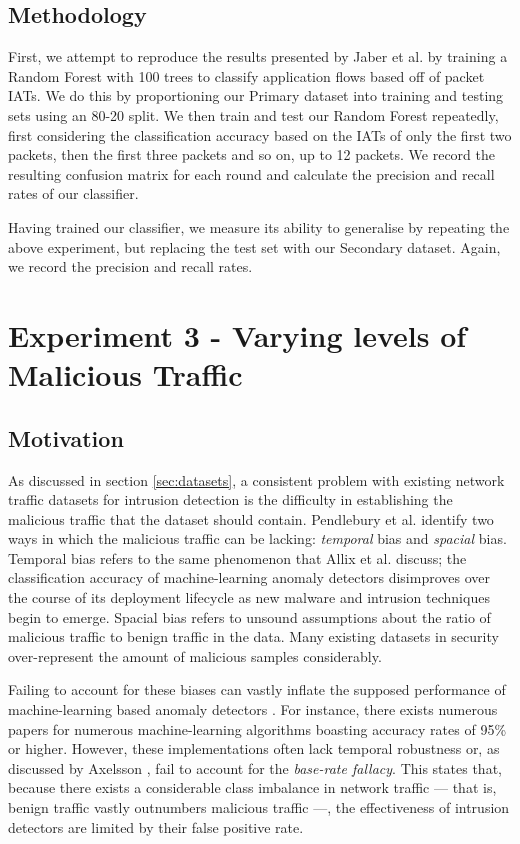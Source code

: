 \documentclass[msc,deptreport, cs]{infthesis} %
\begin{document}
\subsection{Methodology}
\label{sec:exp2_method}
First, we attempt to reproduce the results presented by Jaber et al. by training a Random Forest with 100 trees to classify application flows based off of packet IATs. We do this by proportioning our Primary dataset into training and testing sets using an 80-20 split. We then train and test our Random Forest repeatedly, first considering the classification accuracy based on the IATs of only the first two packets, then the first three packets and so on, up to 12 packets. We record the resulting confusion matrix for each round and calculate the precision and recall rates of our classifier.

Having trained our classifier, we measure its ability to generalise by repeating the above experiment, but replacing the test set with our Secondary dataset. Again, we record the precision and recall rates.

\section{Experiment 3 - Varying levels of Malicious Traffic}

\subsection{Motivation}

As discussed in section \ref{sec:datasets}, a consistent problem with existing network traffic datasets for intrusion detection is the difficulty in establishing the malicious traffic that the dataset should contain. Pendlebury et al. \cite{Pendlebury:2018:EFM:3243734.3278505} identify two ways in which the malicious traffic can be lacking: \textit{temporal} bias and \textit{spacial} bias. Temporal bias refers to the same phenomenon that Allix et al. \cite{allix2014machine} discuss; the classification accuracy of machine-learning anomaly detectors disimproves over the course of its deployment lifecycle as new malware and intrusion techniques begin to emerge. Spacial bias refers to unsound assumptions about the ratio of malicious traffic to benign traffic in the data. Many existing datasets in security over-represent the amount of malicious samples considerably.

Failing to account for these biases can vastly inflate the supposed performance of machine-learning based anomaly detectors \cite{pendlebury2019tesseract}. For instance, there exists numerous papers for numerous machine-learning algorithms boasting accuracy rates of 95\% or higher. However, these implementations often lack temporal robustness or, as discussed by Axelsson \cite{axelsson2000base}, fail to account for the \textit{base-rate fallacy}. This states that, because there exists a considerable class imbalance in network traffic --- that is, benign traffic vastly outnumbers malicious traffic ---, the effectiveness of intrusion detectors are limited by their false positive rate.
\end{document}
